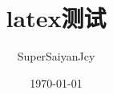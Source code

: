 






\documentclass[a4paper]{article}
\usepackage[margin=1in]{geometry}

\usepackage{amsmath}
\usepackage{color,xcolor}

\usepackage{xeCJK}
\usepackage{fontspec}
\setmainfont{Times New Roman}  %
\usepackage{setspace}
\doublespacing

\usepackage{indentfirst}
\setlength{\parindent}{2em}

\title{latex测试}
\author{SuperSaiyanJcy}
\date{\today}

\maketitle 	%
\newpage
\setcounter{section}{4}
\section{测试标题}
\subsection{你好\ hello}
\sloppy
\noindent
公式测试：$q=\pm ne,\ e = 1.602*10^{-19}C$\\
vabubv





